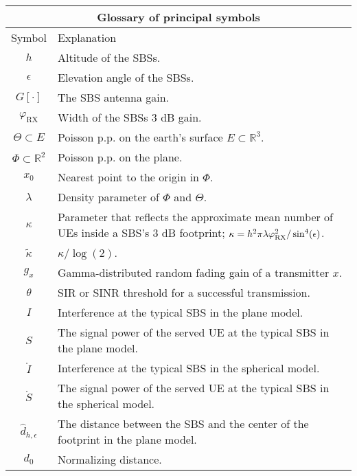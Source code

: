 \documentclass[lettersize,journal]{IEEEtran}
\newcommand{\R}{\mathbb{R}}
\begin{document}
\begin{table}
  \begin{center}
    \begin{tabular}{| c | p{7cm}  |}
      \hline
      \multicolumn{2}{|c|}{Glossary of principal symbols} \\
      \hline
      Symbol& Explanation 
      \\ 
      \hline
      $h$ & Altitude of the SBSs. \\
      $\epsilon$ & Elevation angle of the SBSs. \\
      $G[\cdot]$ & The SBS antenna gain.\\
      $\varphi_{\text{RX}}$ & Width of the SBSs $3$ dB gain. \\
      $\Theta \subset E $ & Poisson p.p. on the earth's surface $E \subset \R^3$. \\
      $\Phi \subset \R^2$ & Poisson p.p. on the plane. \\
      $x_0$ & Nearest point to the origin in $\Phi$.  \\
      $\lambda$ & Density parameter of $\Phi$ and $\Theta$. \\
      $\kappa$ & Parameter that reflects the approximate mean number of UEs inside a SBS's $3$ dB footprint;  $\kappa = h^2\pi \lambda \varphi_{\textup{RX}}^2/\sin^4(\epsilon)$. \\
      ${\tilde{\kappa}}$ &  $\kappa/\log(2)$.\\
      $g_x$ &   Gamma-distributed random fading gain of a transmitter $x$.     \\
      $\theta$ & SIR or SINR threshold for a successful transmission.\\
      $I$ & Interference at the typical SBS in the plane model.\\
      $S$ & The signal power of the served UE at the typical SBS in the plane model.\\
      $\mathring{I}$ & Interference at the typical SBS in the spherical model.\\
      $\mathring{S}$ & The signal power of the served UE at the typical SBS in the spherical model.\\ 
      $\hat{d}_{h,\epsilon}$ & The distance between the SBS and the center of the footprint in the plane model.\\
      $d_{0}$ & Normalizing distance.  \\                        
      \hline
    \end{tabular}
  \end{center}
\end{table}   
\end{document}
